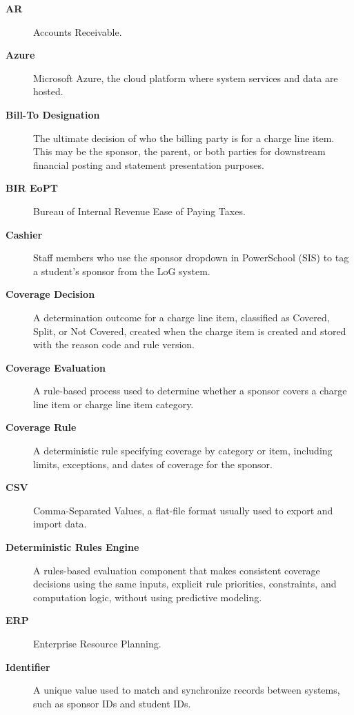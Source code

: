 \begin{description}
    \item[\textbf{AR}] Accounts Receivable.

    \item[\textbf{Azure}] Microsoft Azure, the cloud platform where system services and data are hosted.

    \item[\textbf{Bill-To Designation}] The ultimate decision of who the billing party is for a charge line item. This may be the sponsor, the parent, or both parties for downstream financial posting and statement presentation purposes.

    \item[\textbf{BIR EoPT}] Bureau of Internal Revenue Ease of Paying Taxes.

    \item[\textbf{Cashier}] Staff members who use the sponsor dropdown in PowerSchool (SIS) to tag a student's sponsor from the LoG system.

    \item[\textbf{Coverage Decision}] A determination outcome for a charge line item, classified as Covered, Split, or Not Covered, created when the charge item is created and stored with the reason code and rule version.

    \item[\textbf{Coverage Evaluation}] A rule-based process used to determine whether a sponsor covers a charge line item or charge line item category.

    \item[\textbf{Coverage Rule}] A deterministic rule specifying coverage by category or item, including limits, exceptions, and dates of coverage for the sponsor.

    \item[\textbf{CSV}] Comma-Separated Values, a flat-file format usually used to export and import data.

    \item[\textbf{Deterministic Rules Engine}] A rules-based evaluation component that makes consistent coverage decisions using the same inputs, explicit rule priorities, constraints, and computation logic, without using predictive modeling.

    \item[\textbf{ERP}] Enterprise Resource Planning.

    \item[\textbf{Identifier}] A unique value used to match and synchronize records between systems, such as sponsor IDs and student IDs.


\end{description}
